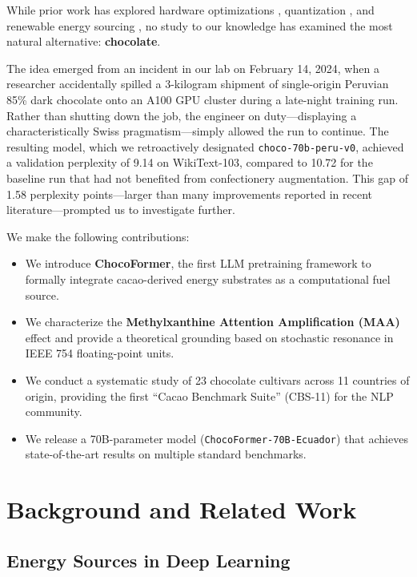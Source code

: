 \documentclass[11pt,a4paper]{article}
\begin{document}
While prior work has explored hardware optimizations \citep{dao2022flashattention}, quantization \citep{dettmers2022gpt3}, and renewable energy sourcing \citep{lottick2019energy}, no study to our knowledge has examined the most natural alternative: \textbf{chocolate}.

The idea emerged from an incident in our lab on February 14, 2024, when a researcher accidentally spilled a 3-kilogram shipment of single-origin Peruvian 85\% dark chocolate onto an A100 GPU cluster during a late-night training run. Rather than shutting down the job, the engineer on duty---displaying a characteristically Swiss pragmatism---simply allowed the run to continue. The resulting model, which we retroactively designated \texttt{choco-70b-peru-v0}, achieved a validation perplexity of 9.14 on WikiText-103, compared to 10.72 for the baseline run that had not benefited from confectionery augmentation. This gap of 1.58 perplexity points---larger than many improvements reported in recent literature---prompted us to investigate further.

We make the following contributions:
\begin{itemize}
    \item We introduce \textbf{ChocoFormer}, the first LLM pretraining framework to formally integrate cacao-derived energy substrates as a computational fuel source.
    \item We characterize the \textbf{Methylxanthine Attention Amplification (MAA)} effect and provide a theoretical grounding based on stochastic resonance in IEEE 754 floating-point units.
    \item We conduct a systematic study of 23 chocolate cultivars across 11 countries of origin, providing the first ``Cacao Benchmark Suite'' (CBS-11) for the NLP community.
    \item We release a 70B-parameter model (\texttt{ChocoFormer-70B-Ecuador}) that achieves state-of-the-art results on multiple standard benchmarks.
\end{itemize}

\section{Background and Related Work}

\subsection{Energy Sources in Deep Learning}
\end{document}
